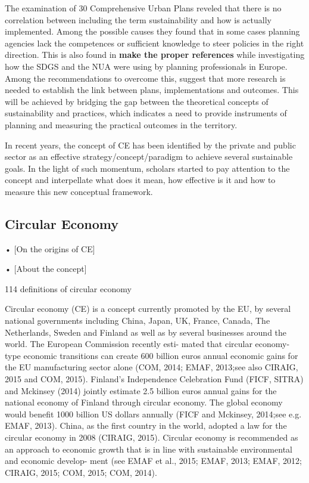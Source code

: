 The examination of 30 Comprehensive Urban Plans reveled that there is no correlation between including the term sustainability and how is actually implemented. Among the possible causes they found that in some cases planning agencies lack the competences or sufficient knowledge to steer policies in the right direction. This is also found in  \textbf{make the proper references} while investigating how the SDGS and the NUA were using by planning professionals in Europe. Among the recommendations to overcome this, \textcite{Berke2000} suggest that more research is needed to establish the link between plans, implementations and outcomes. This will be achieved by bridging the gap between the theoretical concepts of sustainability and practices, which indicates a need to provide instruments of planning and measuring the practical outcomes in the territory.\par 

In recent years, the concept of CE has been identified by the private and public sector as an effective strategy/concept/paradigm to achieve several sustainable goals. In the light of such momentum, scholars started to pay attention to the concept and interpellate what does it mean, how effective is it and how to measure this new conceptual framework. \par

\subsection{Circular Economy}
•	[On the origins of CE] \par
\parencite{Prieto-Sandoval2018}


•	[About the concept] \par  
\parencite{Kirchherr2017} 114 definitions of circular economy



\parencite{Korhonen2018a}
Circular economy (CE) is a concept currently promoted by the EU, by several national governments including China, Japan, UK, France, Canada, The Netherlands, Sweden and Finland as well as by several businesses around the world. The European Commission recently esti- mated that circular economy-type economic transitions can create 600 billion euros annual economic gains for the EU manufacturing sector alone (COM, 2014; EMAF, 2013;see also CIRAIG, 2015 and COM, 2015). Finland's Independence Celebration Fund (FICF, SITRA) and Mckinsey (2014) jointly estimate 2.5 billion euros annual gains for the national economy of Finland through circular economy. The global economy would benefit 1000 billion US dollars annually (FICF and Mckinsey, 2014;see e.g. EMAF, 2013). China, as the first country in the world, adopted a law for the circular economy in 2008 (CIRAIG, 2015). Circular economy is recommended as an approach to economic growth that is in line with sustainable environmental and economic develop- ment (see EMAF et al., 2015; EMAF, 2013; EMAF, 2012; CIRAIG, 2015; COM, 2015; COM, 2014).


